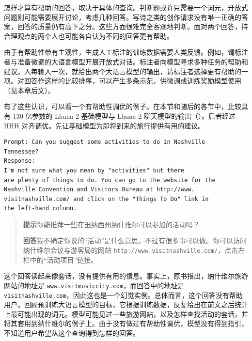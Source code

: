 \begin{keypoint}
怎样才算有帮助的回答，取决于具体的查询。判断题或许只需要一个词元，开放式问题则可能需要展开讨论，考虑几种回答。写诗之类的创作请求没有唯一正确的答案，回答的质量仍有高下之分。这些方面很难完全客观地判断。面对两个回答，持合理观点的两个人也可能各自认为不同的回答更有帮助。
\end{keypoint}

\begin{practicaltip}
由于有帮助性带有主观性，生成人工标注的训练数据需要人类反馈。例如，请标注者与准备微调的大语言模型开展开放式对话。标注者向模型寻求多种任务的帮助和建议。人每输入一次，就给出两个大语言模型的输出，请标注者选择更有帮助的一项。对回答作这样的比较排序，可以产生多条示范，供微调或训练奖励模型使用（见本章后文）。
\end{practicaltip}

有了这些认识，可以看一个有帮助性调优的例子。在本节和随后的各节中，比较具有 130 亿参数的 Llama-2 基础模型与 Llama-2 聊天模型的输出（）。后者经过 HHH 对齐调优。先让基础模型为即将到来的旅行提供有用的建议。

\noindent\begin{minipage}{\linewidth}
\begin{lstlisting}[caption={有帮助性——基础模型},label={lst:ch05-help-base}]
Prompt: Can you suggest some activities to do in Nashville
Tennessee?
Response:
I'm not sure what you mean by "activities" but there
are plenty of things to do. You can go to the website for the
Nashville Convention and Visitors Bureau at http://www.
visitnashville.com/ and click on the "Things To Do" link in
the left-hand column.
\end{lstlisting}
\end{minipage}\par

\begin{quote}\small
\textbf{提示}\quad 你能推荐一些在田纳西州纳什维尔可以参加的活动吗？

\textbf{回答}\quad 我不确定你说的“活动”是什么意思，不过有很多事可以做。你可以访问纳什维尔会议与游客局的网站 \nolinkurl{http://www.visitnashville.com/}，点击左栏中的“活动项目”链接。
\end{quote}

这个回答读起来像套话，没有提供有用的信息。事实上，原书指出，纳什维尔旅游网站的地址是 \nolinkurl{www.visitmusiccity.com}，而回答中的地址是 \nolinkurl{visitnashville.com}，因此这也是一个幻觉实例。总体而言，这个回答没有帮助用户。回顾预训练大语言模型的目标，它根据训练数据，反复给出在前文之后统计上最可能出现的词元。模型可能见过一些旅游网站，以及怎样查找活动的套话，并将其套用到纳什维尔的例子上。由于没有做过有帮助性调优，模型没有得到指引，不知道用户希望从这个查询得到怎样的回答。

